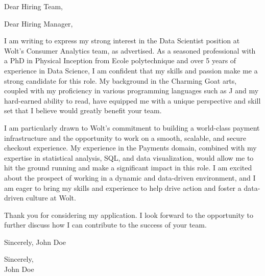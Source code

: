 \documentclass[a4paper,10pt]{letter}
\begin{document}
\begin{letter}{}
\opening{Dear Hiring Team,}

Dear Hiring Manager,

I am writing to express my strong interest in the Data Scientist position at Wolt's Consumer Analytics team, as advertised. As a seasoned professional with a PhD in Physical Inception from Ecole polytechnique and over 5 years of experience in Data Science, I am confident that my skills and passion make me a strong candidate for this role. My background in the Charming Goat arts, coupled with my proficiency in various programming languages such as J and my hard-earned ability to read, have equipped me with a unique perspective and skill set that I believe would greatly benefit your team.

I am particularly drawn to Wolt's commitment to building a world-class payment infrastructure and the opportunity to work on a smooth, scalable, and secure checkout experience. My experience in the Payments domain, combined with my expertise in statistical analysis, SQL, and data visualization, would allow me to hit the ground running and make a significant impact in this role. I am excited about the prospect of working in a dynamic and data-driven environment, and I am eager to bring my skills and experience to help drive action and foster a data-driven culture at Wolt.

Thank you for considering my application. I look forward to the opportunity to further discuss how I can contribute to the success of your team.

Sincerely,
John Doe

\closing{Sincerely,\\John Doe}

\end{letter}
\end{document}

